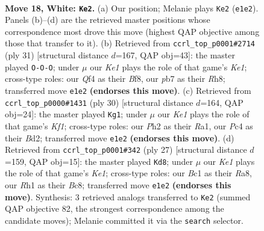 \documentclass[11pt]{article}
\begin{document}
\clearpage

\begin{figure}[p]\centering
\begin{subfigure}{0.46\textwidth}\centering
\resizebox{\linewidth}{!}{%
\newchessgame
\chessboard[
  setfen={r3k1nr/1pq5/4p3/p1bpPp2/b1P2Qpp/P7/RPnN1PPP/2B1KBNR w Kkq - 2 18},
  showmover=false,
  pgfstyle=straightmove, color=movearrow, markmove={e1-e2}
]}
\caption{}
\end{subfigure}\hfill
\begin{subfigure}{0.46\textwidth}\centering
\resizebox{\linewidth}{!}{%
\newchessgame
\chessboard[
  setfen={r3kb1r/pp3p2/1np1bq1p/2Np2p1/1P1P4/P1N1P1P1/2Q2PP1/R3KB1R b KQkq - 3 16},
  showmover=false,
  pgfstyle=straightmove, color=movearrow, markmove={e8-c8}
]}
\caption{}
\end{subfigure}
\\[4pt]
\begin{subfigure}{0.46\textwidth}\centering
\resizebox{\linewidth}{!}{%
\newchessgame
\chessboard[
  setfen={2k2rnr/p2b3p/1pn1ppp1/3pP3/q1pP3P/P1P2NR1/1QPBBPP1/R4K2 w - - 6 16},
  showmover=false,
  pgfstyle=straightmove, color=movearrow, markmove={f1-g1}
]}
\caption{}
\end{subfigure}\hfill
\begin{subfigure}{0.46\textwidth}\centering
\resizebox{\linewidth}{!}{%
\newchessgame
\chessboard[
  setfen={r1b1k2r/pp1nqp2/3p4/1BpP2pp/4n2P/2P1P1B1/P1Q1NPP1/R3K2R b KQkq - 0 14},
  showmover=false,
  pgfstyle=straightmove, color=movearrow, markmove={e8-d8}
]}
\caption{}
\end{subfigure}
\caption{\textbf{Move 18, White: \texttt{Ke2}.} (a) Our position; Melanie plays \texttt{Ke2} (\texttt{e1e2}). Panels (b)--(d) are the retrieved master positions whose correspondence most drove this move (highest QAP objective among those that transfer to it). (b) Retrieved from \texttt{ccrl\_top\_p0001\#2714} (ply 31) [structural distance $d$=167, QAP obj=43]: the master played \texttt{O-O-O}; under $\mu$ our \emph{Ke1} plays the role of that game's \emph{Ke1}; cross-type roles: our \emph{Q}f4 as their \emph{B}f8, our \emph{p}b7 as their \emph{R}h8; transferred move \texttt{e1e2} \textbf{(endorses this move)}. (c) Retrieved from \texttt{ccrl\_top\_p0000\#1431} (ply 30) [structural distance $d$=164, QAP obj=24]: the master played \texttt{Kg1}; under $\mu$ our \emph{Ke1} plays the role of that game's \emph{Kf1}; cross-type roles: our \emph{P}h2 as their \emph{R}a1, our \emph{P}c4 as their \emph{B}d2; transferred move \texttt{e1e2} \textbf{(endorses this move)}. (d) Retrieved from \texttt{ccrl\_top\_p0001\#342} (ply 27) [structural distance $d$=159, QAP obj=15]: the master played \texttt{Kd8}; under $\mu$ our \emph{Ke1} plays the role of that game's \emph{Ke1}; cross-type roles: our \emph{B}c1 as their \emph{R}a8, our \emph{R}h1 as their \emph{B}c8; transferred move \texttt{e1e2} \textbf{(endorses this move)}. Synthesis: 3 retrieved analogs transferred to \texttt{Ke2} (summed QAP objective 82, the strongest correspondence among the candidate moves); Melanie committed it via the \texttt{search} selector.}
\label{fig:thought-m34}
\end{figure}
\end{document}
